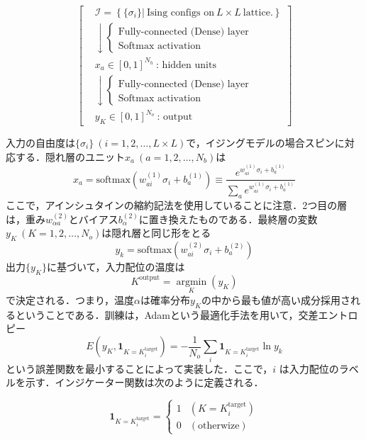 \documentclass[a4paper,11pt]{jsarticle}
\begin{document}
\begin{equation}
  \left[
    \begin{aligned}
       & \mathcal{I} = \left\{ \{ \sigma_i \} \Big| \ \text{Ising configs on} \ L \times L \ \text{lattice.} \right\} \\
       & \downarrow
      \begin{cases}
        \text{Fully-connected (Dense) layer} \\
        \text{Softmax activation}
      \end{cases}                                                                            \\
       & x_a \in [0,1]^{N_h} \ \text{: hidden units}                                                                  \\
       & \downarrow
      \begin{cases}
        \text{Fully-connected (Dense) layer} \\
        \text{Softmax activation}
      \end{cases}                                                                            \\
       & y_K \in [0,1]^{N_o} \ \text{: output}
    \end{aligned}
    \right]
\end{equation}

入力の自由度は$\{ \sigma_i \} \ (i=1,2,\dots,L \times L)$で，イジングモデルの場合スピンに対応する．隠れ層のユニット$x_a \ (a=1,2,\dots,N_b)$は
\begin{equation}
  x_a = \text{softmax}(w_{ai}^{(1)}\sigma_i + b_a^{(1)})
  \equiv \frac{e^{w_{ai}^{(1)}\sigma_i + b_a^{(1)}}}{\sum_a e^{w_{ai}^{(1)}\sigma_i + b_a^{(1)}}}
\end{equation}
ここで，アインシュタインの縮約記法を使用していることに注意．2つ目の層は，重み$w_{\alpha a}^{(2)}$とバイアス$b_{\alpha}^{(2)}$に置き換えたものである．最終層の変数$y_K \ (K=1,2,\dots,N_o)$は隠れ層と同じ形をとる
\begin{equation}
  y_k = \text{softmax}(w_{ai}^{(2)}\sigma_i + b_a^{(2)})
\end{equation}
出力$\{ y_K \}$に基づいて，入力配位の温度は
\begin{equation}
  K^{\text{output}} = \underset{K} {\operatorname{argmin}} (y_K)
\end{equation}
で決定される．つまり，温度$\alpha$は確率分布$y_K$の中から最も値が高い成分採用されるということである．訓練は，Adamという最適化手法を用いて，交差エントロピー
\begin{equation}
  E(y_K,\bm{1}_{K=K_i^{\text{target}}}) = - \frac{1}{N_o}\sum_i \bm{1}_{K=K_i^{\text{target}}} \ln{y_k}
\end{equation}
という誤差関数を最小することによって実装した．ここで，$i$ は入力配位のラベルを示す．インジケーター関数は次のように定義される．\par
\begin{equation}
  \bm{1}_{K=K_i^{\text{target}}} =
  \begin{cases}
    1 & (K=K_i^{\text{target}}) \\
    0 & (\text{otherwize})
  \end{cases}
\end{equation}
\end{document}
